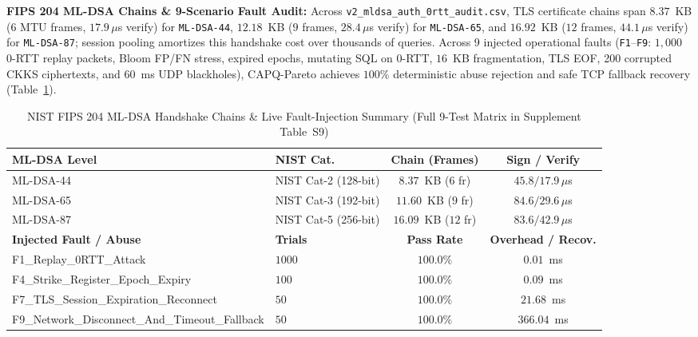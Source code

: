 \documentclass[10pt,journal,compsoc]{IEEEtran}
\begin{document}
\textbf{FIPS 204 ML-DSA Chains \& 9-Scenario Fault Audit:} Across \texttt{v2\_mldsa\_auth\_0rtt\_audit.csv}, TLS certificate chains span $8.37$~KB ($6$ MTU frames, $17.9\,\mu$s verify) for \texttt{ML-DSA-44}, $12.18$~KB ($9$ frames, $28.4\,\mu$s verify) for \texttt{ML-DSA-65}, and $16.92$~KB ($12$ frames, $44.1\,\mu$s verify) for \texttt{ML-DSA-87}; session pooling amortizes this handshake cost over thousands of queries. Across 9 injected operational faults (\texttt{F1}--\texttt{F9}: $1{,}000$ 0-RTT replay packets, Bloom FP/FN stress, expired epochs, mutating SQL on 0-RTT, $16$~KB fragmentation, TLS EOF, 200 corrupted CKKS ciphertexts, and $60$~ms UDP blackholes), CAPQ-Pareto achieves $100\%$ deterministic abuse rejection and safe TCP fallback recovery (Table~\ref{tab:mldsa_fault}).
\begin{table}[!t]
\centering
\caption{NIST FIPS 204 ML-DSA Handshake Chains \& Live Fault-Injection Summary (Full 9-Test Matrix in Supplement Table~S9)}
\label{tab:mldsa_fault}
\setlength{\tabcolsep}{2.6pt}
\renewcommand{\arraystretch}{1.05}
\begin{adjustbox}{max width=\columnwidth}
\begin{tabular}{@{}llcc@{}}
\toprule
\textbf{ML-DSA Level} & \textbf{NIST Cat.} & \textbf{Chain (Frames)} & \textbf{Sign / Verify} \\
\midrule
ML-DSA-44 & NIST Cat-2 (128-bit) & $8.37$~KB ($6$ fr) & $45.8 / 17.9\,\mu$s \\
ML-DSA-65 & NIST Cat-3 (192-bit) & $11.60$~KB ($9$ fr) & $84.6 / 29.6\,\mu$s \\
ML-DSA-87 & NIST Cat-5 (256-bit) & $16.09$~KB ($12$ fr) & $83.6 / 42.9\,\mu$s \\
\midrule
\textbf{Injected Fault / Abuse} & \textbf{Trials} & \textbf{Pass Rate} & \textbf{Overhead / Recov.} \\
\midrule
F1\_Replay\_0RTT\_Attack & $1000$ & $100.0\%$ & $0.01$~ms \\
F4\_Strike\_Register\_Epoch\_Expiry & $100$ & $100.0\%$ & $0.09$~ms \\
F7\_TLS\_Session\_Expiration\_Reconnect & $50$ & $100.0\%$ & $21.68$~ms \\
F9\_Network\_Disconnect\_And\_Timeout\_Fallback & $50$ & $100.0\%$ & $366.04$~ms \\
\bottomrule
\end{tabular}
\end{adjustbox}
\end{table}
\end{document}
